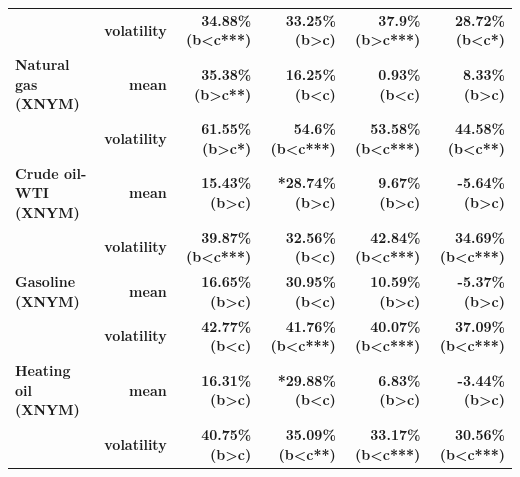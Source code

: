 \documentclass[
  authoryear,
  preprint,
  3p]{elsarticle}
\begin{document}
\begin{longtable}[t]{>{}l>{}r>{}r>{}r>{}r>{}r}
\textbf{} & \textbf{volatility} & \textcolor[HTML]{4285f4}{\textbf{34.88\% (b<c***)}} & \textcolor[HTML]{4285f4}{\textbf{33.25\% (b>c)}} & \textcolor[HTML]{4285f4}{\textbf{37.9\% (b>c***)}} & \textcolor[HTML]{4285f4}{\textbf{28.72\% (b<c*)}}\\
\addlinespace
\textbf{Natural gas (XNYM)} & \textbf{mean} & \textcolor[HTML]{4285f4}{\textbf{35.38\% (b>c**)}} & \textcolor[HTML]{4285f4}{\textbf{16.25\% (b<c)}} & \textcolor[HTML]{4285f4}{\textbf{0.93\% (b<c)}} & \textcolor[HTML]{4285f4}{\textbf{8.33\% (b>c)}}\\
\textbf{} & \textbf{volatility} & \textcolor[HTML]{4285f4}{\textbf{61.55\% (b>c*)}} & \textcolor[HTML]{4285f4}{\textbf{54.6\% (b<c***)}} & \textcolor[HTML]{4285f4}{\textbf{53.58\% (b<c***)}} & \textcolor[HTML]{4285f4}{\textbf{44.58\% (b<c**)}}\\
\textbf{Crude oil-WTI (XNYM)} & \textbf{mean} & \textcolor[HTML]{4285f4}{\textbf{15.43\% (b>c)}} & \textcolor[HTML]{4285f4}{\textbf{*28.74\% (b>c)}} & \textcolor[HTML]{4285f4}{\textbf{9.67\% (b>c)}} & \textcolor[HTML]{4285f4}{\textbf{-5.64\% (b>c)}}\\
\textbf{} & \textbf{volatility} & \textcolor[HTML]{4285f4}{\textbf{39.87\% (b<c***)}} & \textcolor[HTML]{4285f4}{\textbf{32.56\% (b<c)}} & \textcolor[HTML]{4285f4}{\textbf{42.84\% (b<c***)}} & \textcolor[HTML]{4285f4}{\textbf{34.69\% (b<c***)}}\\
\textbf{Gasoline (XNYM)} & \textbf{mean} & \textcolor[HTML]{4285f4}{\textbf{16.65\% (b>c)}} & \textcolor[HTML]{4285f4}{\textbf{30.95\% (b<c)}} & \textcolor[HTML]{4285f4}{\textbf{10.59\% (b>c)}} & \textcolor[HTML]{4285f4}{\textbf{-5.37\% (b>c)}}\\
\addlinespace
\textbf{} & \textbf{volatility} & \textcolor[HTML]{4285f4}{\textbf{42.77\% (b<c)}} & \textcolor[HTML]{4285f4}{\textbf{41.76\% (b<c***)}} & \textcolor[HTML]{4285f4}{\textbf{40.07\% (b<c***)}} & \textcolor[HTML]{4285f4}{\textbf{37.09\% (b<c***)}}\\
\textbf{Heating oil (XNYM)} & \textbf{mean} & \textcolor[HTML]{4285f4}{\textbf{16.31\% (b>c)}} & \textcolor[HTML]{4285f4}{\textbf{*29.88\% (b<c)}} & \textcolor[HTML]{4285f4}{\textbf{6.83\% (b>c)}} & \textcolor[HTML]{4285f4}{\textbf{-3.44\% (b>c)}}\\
\textbf{} & \textbf{volatility} & \textcolor[HTML]{4285f4}{\textbf{40.75\% (b>c)}} & \textcolor[HTML]{4285f4}{\textbf{35.09\% (b<c**)}} & \textcolor[HTML]{4285f4}{\textbf{33.17\% (b<c***)}} & \textcolor[HTML]{4285f4}{\textbf{30.56\% (b<c***)}}\\

\end{longtable}
\end{document}
